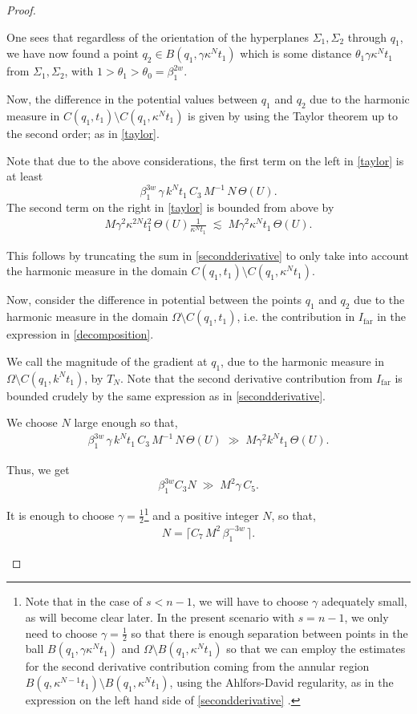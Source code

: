 \documentclass{article}
\theoremstyle{plain}
\theoremstyle{plain}
\theoremstyle{definition}
\theoremstyle{plain}
\begin{document}
\begin{proof}
\begin{itemize}
One sees that regardless of the orientation of the hyperplanes $\Sigma_1,\Sigma_2$ through $q_1$, we have now found a point $q_2 \in B(q_1,\gamma \kappa^N t_1)$ which is some distance
$\theta_1 \gamma \kappa^N t_1$ from $\Sigma_1,\Sigma_2$, with $1 > \theta_1 > \theta_0=\beta_{1}^{2w}$.

Now, the difference in the potential values between $q_1$ and $q_2$
due to the harmonic measure in $C(q_1,t_1)\setminus C(q_1,\kappa^N t_1)$ is given by using the Taylor theorem up to the second order; as in \cref{taylor}.

Note that due to the above considerations, the first term on the left in
\eqref{taylor} is at least
\[
\beta_1^{3w}\,\gamma\,k^{N }t_1\,C_3\,M^{-1}\,N\,\Theta(U).
\]
The second term on the right in \eqref{taylor} is bounded from above by
\begin{align}
M\gamma^2 \kappa^{2N} t_{1}^{2}\,\Theta(U)\frac{1}{\kappa^{N}t_1}
\;\lesssim\;
M\gamma^2 \kappa^{N} t_1\,\Theta(U).
\end{align}

This follows by truncating the sum in \cref{secondderivative} to only take into account the harmonic measure in the domain $C(q_1,t_1)\setminus C(q_1,\kappa^N t_1)$. 

Now, consider the difference in potential between the points $q_1$ and $q_2$ due to the harmonic measure in the domain $\Omega \setminus C(q_1, t_1)$, i.e. the contribution in $I_{\text{far}}$ in the expression in \cref{decomposition}.

We call the magnitude of the gradient at $q_1$, due to the harmonic measure in
$\Omega \setminus C(q_1, k^N t_1)$, by $T_N$. Note that the second derivative contribution from $I_{\text{far}}$ is bounded
crudely by the same expression as in \cref{secondderivative}.

We choose $N$ large enough so that,
\begin{align}\label{eq48}
\beta_1^{3w}\,\gamma\,k^{N }t_1\,C_3\,M^{-1}\,N\,\Theta(U)
\;\gg\;
M\gamma^2 k^{N }t_1\,\Theta(U).
\end{align}

Thus, we get
\[
\beta_1^{3w} C_3 N \;\gg\; M^2 \gamma\, C_5.
\]

It is enough to choose $\gamma=\frac{1}{2}$\footnote{Note that in the case of $s<n-1$, we will have to choose $\gamma$ adequately small, as will become clear later. In the present scenario with $s=n-1$, we only need to choose $\gamma=\frac{1}{2}$ so that there is enough separation between points in the ball $B(q_1, \gamma\kappa^N t_1)$ and $\Omega\setminus B(q_1, \kappa^N t_1)$ so that we can employ the estimates for the second derivative contribution coming from the annular region $B(q,\kappa^{N-1}t_1)\setminus B(q_1,\kappa^N t_1)$, using the Ahlfors-David regularity, as in the expression on the left hand side of \cref{secondderivative} .} and a positive integer $N$, so that,
\begin{align}\label{Nlowerbound}
N= \lceil C_7\,M^2\,\beta_1^{-3w}\, \rceil.
\end{align}


\end{itemize}
\end{proof}
\end{document}

